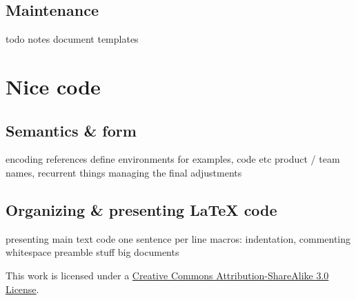 \documentclass[a4paper,twoside,nofonts]{tufte-handout}
\begin{document}
\subsection{Maintenance} %
\label{sub:maintenance}

\begin{todoenv}
    todo notes
    document templates
\end{todoenv}



\clearpage
\section{Nice code} %
\label{sec:code}

\subsection{Semantics \& form} %
\label{sub:semantics}

\begin{todoenv}
    encoding
    references
    define environments for examples, code etc
    product / team names, recurrent things
    managing the final adjustments
\end{todoenv}

\subsection{Organizing \& presenting \LaTeX{} code} %
\label{sub:format}

\begin{todoenv}
    presenting main text code
    one sentence per line
    macros: indentation, commenting whitespace
    preamble stuff
    big documents
\end{todoenv}



\clearpage

\nocite{*}


\vfill
\begin{fullwidth}\centering
  \ccbysa\quad
  This work is licensed under a \href{http://creativecommons.org/licenses/by-sa/3.0/}{Creative Commons Attribution-ShareAlike 3.0 License}.
\end{fullwidth}
\clearpage\todos
\end{document}
